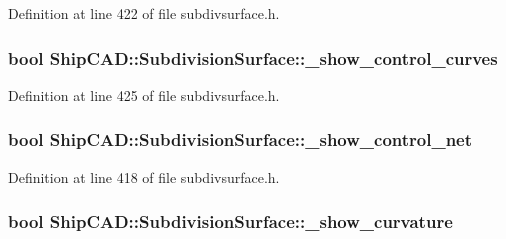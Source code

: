 Definition at line 422 of file subdivsurface.\+h.

\subsubsection[{\texorpdfstring{\+\_\+show\+\_\+control\+\_\+curves}{_show_control_curves}}]{\setlength{\rightskip}{0pt plus 5cm}bool Ship\+C\+A\+D\+::\+Subdivision\+Surface\+::\+\_\+show\+\_\+control\+\_\+curves\hspace{0.3cm}{\ttfamily [protected]}}\hypertarget{classShipCAD_1_1SubdivisionSurface_ae240b2177e0af0bd1512c94b524f22dd}{}\label{classShipCAD_1_1SubdivisionSurface_ae240b2177e0af0bd1512c94b524f22dd}


Definition at line 425 of file subdivsurface.\+h.

\subsubsection[{\texorpdfstring{\+\_\+show\+\_\+control\+\_\+net}{_show_control_net}}]{\setlength{\rightskip}{0pt plus 5cm}bool Ship\+C\+A\+D\+::\+Subdivision\+Surface\+::\+\_\+show\+\_\+control\+\_\+net\hspace{0.3cm}{\ttfamily [protected]}}\hypertarget{classShipCAD_1_1SubdivisionSurface_ab9bb374cf1368b4a2c779f953bca88a8}{}\label{classShipCAD_1_1SubdivisionSurface_ab9bb374cf1368b4a2c779f953bca88a8}


Definition at line 418 of file subdivsurface.\+h.

\subsubsection[{\texorpdfstring{\+\_\+show\+\_\+curvature}{_show_curvature}}]{\setlength{\rightskip}{0pt plus 5cm}bool Ship\+C\+A\+D\+::\+Subdivision\+Surface\+::\+\_\+show\+\_\+curvature\hspace{0.3cm}{\ttfamily [protected]}}\hypertarget{classShipCAD_1_1SubdivisionSurface_abe2167085eac50c986b074635b610462}{}\label{classShipCAD_1_1SubdivisionSurface_abe2167085eac50c986b074635b610462}


